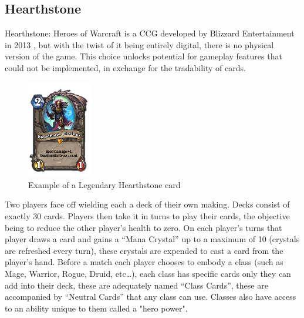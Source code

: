 \documentclass{report} %
\begin{document}
\subsection{Hearthstone}
	Hearthstone: Heroes of Warcraft is a CCG developed by Blizzard Entertainment in 2013 \cite{HS}, but with the twist of it being entirely digital, there is no physical version of the game. This choice unlocks potential for gameplay features that could not be implemented, in exchange for the tradability of cards. \\ 
\begin{figure}[h]
\centering
\includegraphics[width=0.25\textwidth]{thalnos}
\caption{Example of a Legendary Hearthstone card\protect\footnotemark
\label{card}
}
\end{figure}

	\indent Two players face off wielding each a deck of their own making. Decks consist of exactly 30 cards. Players then take it in turns to play their cards, the objective being to reduce the other player's health to zero. On each player's turns that player draws a card and gains a “Mana Crystal” up to a maximum of 10 (crystals are refreshed every turn), these crystals are expended to cast a card from the player's hand. Before a match each player chooses to embody a class (such as Mage, Warrior, Rogue, Druid, etc…), each class has specific cards only they can add into their deck, these are adequately named “Class Cards”, these are accompanied by “Neutral Cards” that any class can use. Classes also have access to an ability unique to them called a "hero power". \\
	
\end{document}
